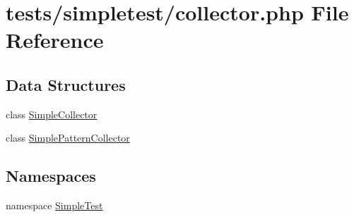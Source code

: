 \hypertarget{collector_8php}{\section{tests/simpletest/collector.php File Reference}
\label{collector_8php}
}
\subsection*{Data Structures}
\begin{DoxyCompactItemize}
\item 
class \hyperlink{class_simple_collector}{Simple\-Collector}
\item 
class \hyperlink{class_simple_pattern_collector}{Simple\-Pattern\-Collector}
\end{DoxyCompactItemize}
\subsection*{Namespaces}
\begin{DoxyCompactItemize}
\item 
namespace \hyperlink{namespace_simple_test}{Simple\-Test}
\end{DoxyCompactItemize}
